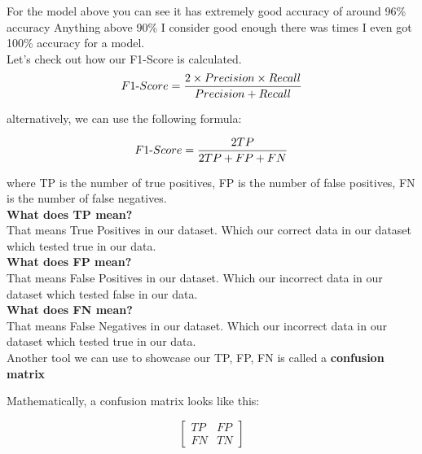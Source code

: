 For the model above you can see it has extremely good accuracy of around 96\% accuracy
Anything above 90\% I consider good enough there was times I even got 100\% accuracy for a model. \\
Let’s check out how our F1-Score is calculated. \\

\begin{equation}
    F1\textnormal{-}Score = \frac{2 \times Precision \times Recall}{Precision + Recall}
\end{equation}

alternatively, we can use the following formula:

    \begin{equation}
        F1\textnormal{-}Score = \frac{2TP}{2TP+FP+FN}
    \end{equation}

where TP is the number of true positives, FP is the number of false positives, FN is the number of false negatives. \\

\textbf{What does TP mean?} \\
That means True Positives in our dataset. Which our correct data in our dataset which tested true in our data. \\
\textbf{What does FP mean?} \\
That means False Positives in our dataset. Which our incorrect data in our dataset which tested false in our data. \\
\textbf{What does FN mean?} \\
That means False Negatives in our dataset. Which our incorrect data in our dataset which tested true in our data. \\






Another tool we can use to showcase our TP, FP, FN is called a \textbf{confusion matrix}

Mathematically, a confusion matrix looks like this:

\begin{equation}
    \begin{bmatrix}
        TP & FP \\
        FN & TN
    \end{bmatrix}
\end{equation} \\

